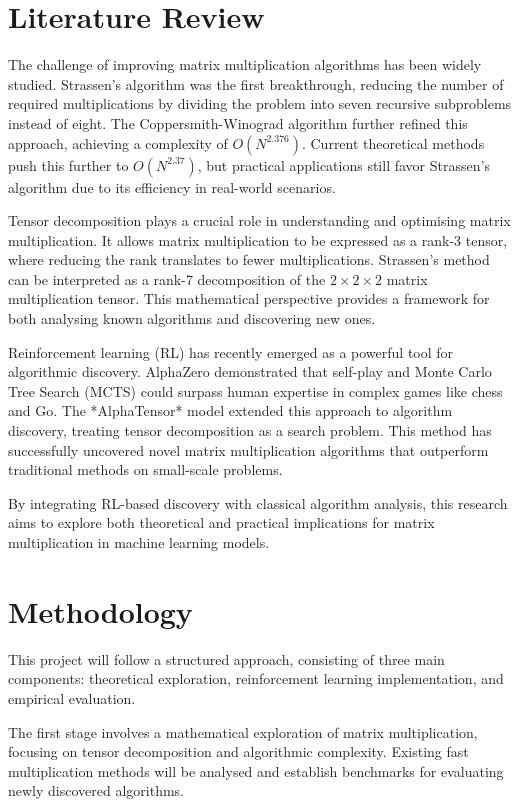 \documentclass{article}
\begin{document}
\section{Literature Review}
The challenge of improving matrix multiplication algorithms has been widely studied. Strassen's algorithm \cite{strassen1969gaussian} was the first breakthrough, reducing the number of required multiplications by dividing the problem into seven recursive subproblems instead of eight. The Coppersmith-Winograd algorithm \cite{coppersmith1990matrix} further refined this approach, achieving a complexity of \( O(N^{2.376}) \). Current theoretical methods push this further to \( O(N^{2.37}) \), but practical applications still favor Strassen's algorithm due to its efficiency in real-world scenarios.  

Tensor decomposition plays a crucial role in understanding and optimising matrix multiplication. It allows matrix multiplication to be expressed as a rank-3 tensor, where reducing the rank translates to fewer multiplications. Strassen's method can be interpreted as a rank-7 decomposition of the \( 2 \times 2 \times 2 \) matrix multiplication tensor. This mathematical perspective provides a framework for both analysing known algorithms and discovering new ones.  

Reinforcement learning (RL) has recently emerged as a powerful tool for algorithmic discovery. AlphaZero demonstrated that self-play and Monte Carlo Tree Search (MCTS) could surpass human expertise in complex games like chess and Go. The *AlphaTensor* model \cite{fawzi2022discovering} extended this approach to algorithm discovery, treating tensor decomposition as a search problem. This method has successfully uncovered novel matrix multiplication algorithms that outperform traditional methods on small-scale problems.  

By integrating RL-based discovery with classical algorithm analysis, this research aims to explore both theoretical and practical implications for matrix multiplication in machine learning models.

\section{Methodology}
This project will follow a structured approach, consisting of three main components: theoretical exploration, reinforcement learning implementation, and empirical evaluation.  

The first stage involves a mathematical exploration of matrix multiplication, focusing on tensor decomposition and algorithmic complexity. Existing fast multiplication methods will be analysed and establish benchmarks for evaluating newly discovered algorithms.  
\end{document}
